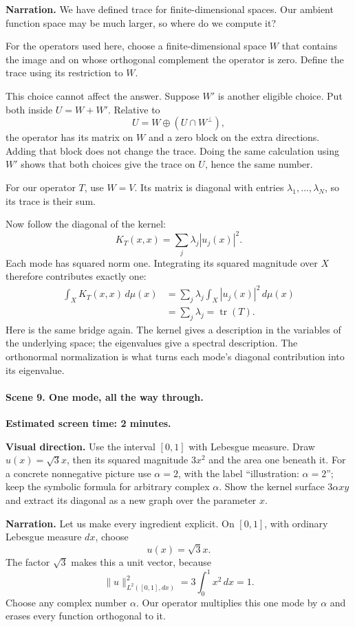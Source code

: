 \textbf{Narration.} We have defined trace for finite-dimensional spaces. Our ambient function space may be much larger, so where do we compute it?

For the operators used here, choose a finite-dimensional space $W$ that contains the image and on whose orthogonal complement the operator is zero. Define the trace using its restriction to $W$.

This choice cannot affect the answer. Suppose $W'$ is another eligible choice. Put both inside $U=W+W'$. Relative to
\[
U=W\oplus(U\cap W^\perp),
\]
the operator has its matrix on $W$ and a zero block on the extra directions. Adding that block does not change the trace. Doing the same calculation using $W'$ shows that both choices give the trace on $U$, hence the same number.

For our operator $T$, use $W=V$. Its matrix is diagonal with entries $\lambda_1,\ldots,\lambda_N$, so its trace is their sum.

Now follow the diagonal of the kernel:
\[
K_T(x,x)=\sum_j\lambda_j|u_j(x)|^2.
\]
Each mode has squared norm one. Integrating its squared magnitude over $X$ therefore contributes exactly one:
\[
\begin{aligned}
\int_X K_T(x,x)\,d\mu(x)
&=\sum_j\lambda_j\int_X|u_j(x)|^2\,d\mu(x)\\
&=\sum_j\lambda_j=\operatorname{tr}(T).
\end{aligned}
\]
Here is the same bridge again. The kernel gives a description in the variables of the underlying space; the eigenvalues give a spectral description. The orthonormal normalization is what turns each mode's diagonal contribution into its eigenvalue.

\paragraph{Scene 9. One mode, all the way through.}
\textbf{Estimated screen time: 2 minutes.}

\textbf{Visual direction.} Use the interval $[0,1]$ with Lebesgue measure. Draw $u(x)=\sqrt3x$, then its squared magnitude $3x^2$ and the area one beneath it. For a concrete nonnegative picture use $\alpha=2$, with the label ``illustration: $\alpha=2$''; keep the symbolic formula for arbitrary complex $\alpha$. Show the kernel surface $3\alpha xy$ and extract its diagonal as a new graph over the parameter $x$.

\textbf{Narration.} Let us make every ingredient explicit. On $[0,1]$, with ordinary Lebesgue measure $dx$, choose
\[
u(x)=\sqrt3x.
\]
The factor $\sqrt3$ makes this a unit vector, because
\[
\|u\|_{L^2([0,1],dx)}^2=3\int_0^1x^2\,dx=1.
\]
Choose any complex number $\alpha$. Our operator multiplies this one mode by $\alpha$ and erases every function orthogonal to it.

